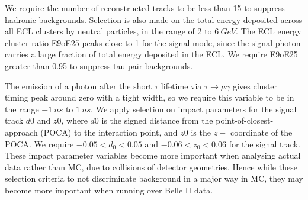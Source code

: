 \documentclass[12pt]{thesis}  %
\begin{document}
We require the number of reconstructed tracks to be less than 15 to suppress hadronic backgrounds. Selection is also made on the total energy deposited across all ECL clusters by neutral particles, in the range of 2 to $\SI{6}{GeV}$. The ECL energy cluster ratio E9oE25 peaks close to 1 for the signal mode, since the signal photon carries a large fraction of total energy deposited in the ECL. We require E9oE25 greater than \num{0.95} to suppress tau-pair backgrounds.

The emission of a photon after the short $\tau$ lifetime via $\tau\to\mu\gamma$ gives cluster timing peak around zero with a tight width, so we require this variable to be in the range $\SI{-1}{ns}$ to $\SI{1}{ns}$. We apply selection on impact parameters for the signal track $d0$ and $z0$, where $d0$ is the signed distance from the point-of-closest-approach (POCA) to the interaction point, and $z0$ is the $z-$ coordinate of the POCA. We require $-0.05 < d_0 < 0.05$ and $-0.06 < z_0 < 0.06$ for the signal track. These impact parameter variables become more important when analysing actual data rather than MC, due to collisions of detector geometries. Hence while these selection criteria to not discriminate background in a major way in MC, they may become more important when running over Belle II data.
\end{document}
